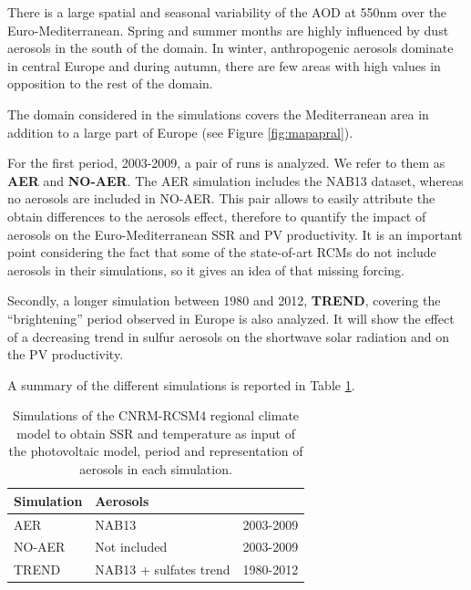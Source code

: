 There is a large spatial and seasonal variability of the AOD at 550nm over the Euro-Mediterranean. Spring and summer months are highly influenced by dust aerosols in the south of the domain. In winter, anthropogenic aerosols dominate in central Europe and during autumn, there are few areas with high values in opposition to the rest of the domain.

The domain considered in the simulations covers the Mediterranean area in addition to a large part of Europe (see Figure \ref{fig:mapapral}).

For the first period, 2003-2009, a pair of runs is analyzed. We refer to them as \textbf{AER} and \textbf{NO-AER}. The AER simulation includes the NAB13 dataset, whereas no aerosols are included in NO-AER. This pair allows to easily attribute the obtain differences to the aerosols effect, therefore to quantify the impact of aerosols on the Euro-Mediterranean SSR and PV productivity. It is an important point considering the fact that some of the state-of-art RCMs do not include aerosols in their simulations, so it gives an idea of that missing forcing.

Secondly, a longer simulation between 1980 and 2012, \textbf{TREND}, covering the ``brightening'' period observed in Europe is also analyzed. It will show the effect of a decreasing trend in sulfur aerosols on the shortwave solar radiation and on the PV productivity.  

A summary of the different simulations is reported in Table \ref{tabSIM}.

\begin{table}
  \begin{tabular}{>{\raggedright}m{2cm}>{\raggedright}m{3cm}>{\raggedright}m{2cm}}
    \toprule 
    Simulation & Aerosols & \centering{Period}\tabularnewline
    \midrule
    AER & NAB13 & 2003-2009
    \tabularnewline
    \midrule
    NO-AER & Not included & 2003-2009
   \tabularnewline
   \midrule           
  TREND & NAB13 + sulfates trend & 1980-2012
   \tabularnewline
    \bottomrule
  \end{tabular}
  \caption[Simulations of the CNRM-RCSM4 used as input of the PV model, period and aerosols representation]{Simulations of the CNRM-RCSM4 regional climate model to obtain SSR and temperature as input of the photovoltaic model, period and representation of aerosols in each simulation.}
\label{tabSIM}
\end{table}


